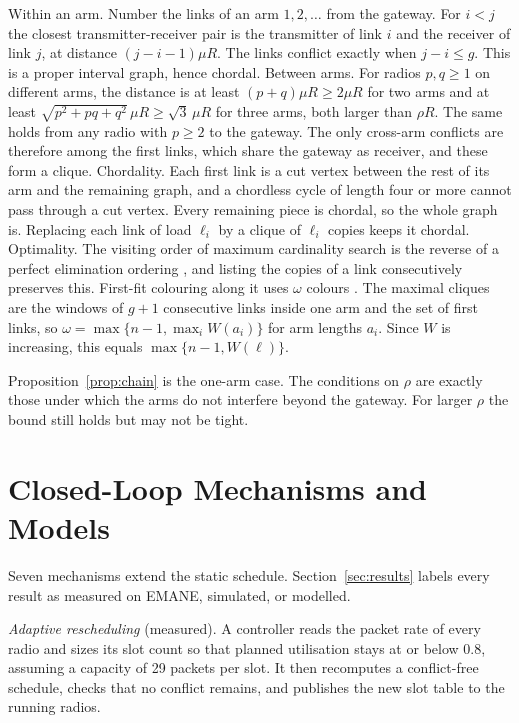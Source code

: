 \documentclass[conference]{IEEEtran}
\begin{document}
\begin{IEEEproof}
Within an arm. Number the links of an arm $1,2,\dots$ from the gateway. For $i<j$ the closest transmitter-receiver pair is the transmitter of link $i$ and the receiver of link $j$, at distance $(j-i-1)\mu R$. The links conflict exactly when $j-i\le g$. This is a proper interval graph, hence chordal. Between arms. For radios $p,q\ge1$ on different arms, the distance is at least $(p+q)\mu R\ge 2\mu R$ for two arms and at least $\sqrt{p^2+pq+q^2}\,\mu R\ge\sqrt3\,\mu R$ for three arms, both larger than $\rho R$. The same holds from any radio with $p\ge2$ to the gateway. The only cross-arm conflicts are therefore among the first links, which share the gateway as receiver, and these form a clique. Chordality. Each first link is a cut vertex between the rest of its arm and the remaining graph, and a chordless cycle of length four or more cannot pass through a cut vertex. Every remaining piece is chordal, so the whole graph is. Replacing each link of load $\ell_i$ by a clique of $\ell_i$ copies keeps it chordal. Optimality. The visiting order of maximum cardinality search is the reverse of a perfect elimination ordering \cite{tarjan1984}, and listing the copies of a link consecutively preserves this. First-fit colouring along it uses $\omega$ colours \cite{golumbic1980}. The maximal cliques are the windows of $g+1$ consecutive links inside one arm and the set of first links, so $\omega=\max\{n-1,\max_i W(a_i)\}$ for arm lengths $a_i$. Since $W$ is increasing, this equals $\max\{n-1,W(\ell)\}$.
\end{IEEEproof}
Proposition~\ref{prop:chain} is the one-arm case. The conditions on $\rho$ are exactly those under which the arms do not interfere beyond the gateway. For larger $\rho$ the bound still holds but may not be tight.

\section{Closed-Loop Mechanisms and Models}\label{sec:evo}
Seven mechanisms extend the static schedule. Section~\ref{sec:results} labels every result as measured on EMANE, simulated, or modelled.

\emph{Adaptive rescheduling} (measured). A controller reads the packet rate of every radio and sizes its slot count so that planned utilisation stays at or below $0.8$, assuming a capacity of 29 packets per slot. It then recomputes a conflict-free schedule, checks that no conflict remains, and publishes the new slot table to the running radios.
\end{document}
